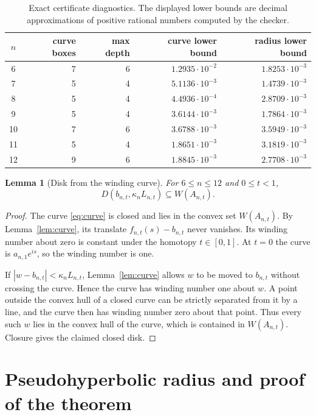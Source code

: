 \documentclass[11pt]{article}
\newtheorem{lemma}[theorem]{Lemma}
\begin{document}
\begin{table}[ht]
\centering
\caption{Exact certificate diagnostics.  The displayed lower bounds are
decimal approximations of positive rational numbers computed by the checker.}
\label{tab:certificate}
\begin{tabular}{c r r r r}
\toprule
$n$&curve boxes&max depth&curve lower bound&radius lower bound\\
\midrule
6&7&6&$1.2935\cdot10^{-2}$&$1.8253\cdot10^{-3}$\\
7&5&4&$5.1136\cdot10^{-3}$&$1.4739\cdot10^{-3}$\\
8&5&4&$4.4936\cdot10^{-4}$&$2.8709\cdot10^{-3}$\\
9&5&4&$3.6144\cdot10^{-3}$&$1.7864\cdot10^{-3}$\\
10&7&6&$3.6788\cdot10^{-3}$&$3.5949\cdot10^{-3}$\\
11&5&4&$1.8651\cdot10^{-3}$&$3.1819\cdot10^{-3}$\\
12&9&6&$1.8845\cdot10^{-3}$&$2.7708\cdot10^{-3}$\\
\bottomrule
\end{tabular}
\end{table}

\begin{lemma}[Disk from the winding curve]\label{lem:winding}
For $6\leq n\leq12$ and $0\leq t<1$,
\[
 D(b_{n,t},\kappa_nL_{n,t})\subseteq W(A_{n,t}).
\]
\end{lemma}

\begin{proof}
The curve \eqref{eq:curve} is closed and lies in the convex set
$W(A_{n,t})$.  By Lemma~\ref{lem:curve}, its translate
$f_{n,t}(s)-b_{n,t}$ never vanishes.  Its winding number about zero is
constant under the homotopy $t\in[0,1]$.  At $t=0$ the curve is
$a_{n,1}e^{is}$, so the winding number is one.

If $|w-b_{n,t}|<\kappa_nL_{n,t}$, Lemma~\ref{lem:curve} allows $w$ to be
moved to $b_{n,t}$ without crossing the curve.  Hence the curve has winding
number one about $w$.  A point outside the convex hull of a closed curve can
be strictly separated from it by a line, and the curve then has winding
number zero about that point.  Thus every such $w$ lies in the convex hull
of the curve, which is contained in $W(A_{n,t})$.  Closure gives the claimed
closed disk.
\end{proof}

\section{Pseudohyperbolic radius and proof of the theorem}
\end{document}
